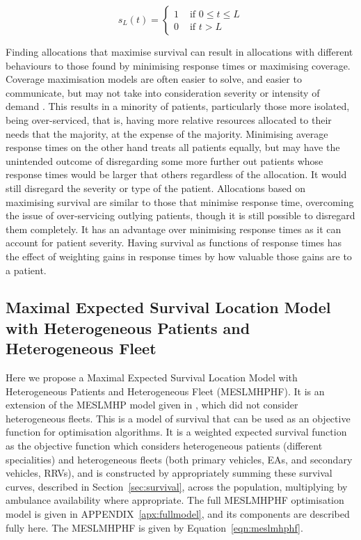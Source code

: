 \documentclass[numbers,webpdf,imaman]{ima-authoring-template}%
\begin{document}
\begin{equation}\label{eqn:survival_cutoff}
    s_L(t) = \begin{cases}
    1 & \text{ if } 0\leq t \leq L \\
    0 & \text{ if } t > L 
    \end{cases}
\end{equation}

Finding allocations that maximise survival can result in
allocations with different behaviours to those found by minimising response
times or maximising coverage. Coverage maximisation models are often easier to
solve, and easier to communicate, but may not take into consideration severity
or intensity of demand \citep{Erkut200842}. This results in a minority of
patients, particularly those more isolated, being over-serviced, that is, having
more relative resources allocated to their needs that the majority, at the
expense of the majority. Minimising average response times on the other hand
treats all patients equally, but may have the unintended outcome of disregarding
some more further out patients whose response times would be larger that others
regardless of the allocation. It would still disregard the severity or type of
the patient. Allocations based on maximising survival are similar to those that
minimise response time, overcoming the issue of over-servicing outlying
patients, though it is still possible to disregard them completely. It has an
advantage over minimising response times as it can account for patient severity.
Having survival as functions of response times has the effect of weighting gains
in response times by how valuable those gains are to a patient.

\subsection{Maximal Expected Survival Location Model with Heterogeneous
            Patients and Heterogeneous Fleet}\label{sec:meslmhphf}
Here we propose a Maximal Expected Survival Location Model with Heterogeneous
Patients and Heterogeneous Fleet (MESLMHPHF). It is an extension of the
MESLMHP model given in \citet{Knight2012918}, which did not consider
heterogeneous fleets. This is a model of survival that can be used as an
objective function for optimisation algorithms. It is a weighted expected
survival function as the objective function which considers heterogeneous
patients (different specialities) and heterogeneous fleets (both primary
vehicles, EAs, and secondary vehicles, RRVs), and is constructed by
appropriately summing these survival curves, described in
Section~\ref{sec:survival}, across the population, multiplying by ambulance
availability where appropriate.
The full MESLMHPHF optimisation model is given in
APPENDIX~\ref{apx:fullmodel}, and its components are described fully here.
The MESLMHPHF is given by Equation~\ref{eqn:meslmhphf}.
\end{document}
